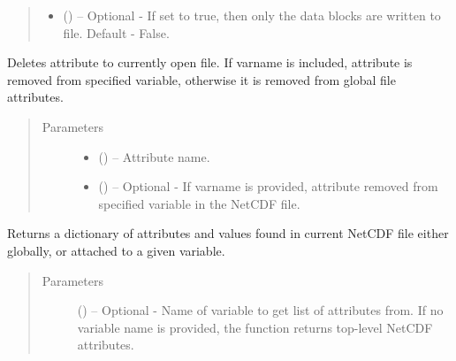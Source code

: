 \documentclass[a4paper,10pt,openany,english]{sphinxmanual}
\begin{document}
\begin{fulllineitems}
\begin{fulllineitems}
\begin{quote}
\begin{description}
\begin{itemize}
\item {} 
 () -- Optional - If set to true, then only the data blocks are written to file.
Default - False.

\end{itemize}

\end{description}\end{quote}

\end{fulllineitems}


\begin{fulllineitems}
\label{egadsapi:egads.input.netcdf_io.NetCdf.delete_attribute}
Deletes attribute to currently open file. If varname is included, attribute
is removed from specified variable, otherwise it is removed from global file
attributes.
\begin{quote}\begin{description}
\item[{Parameters}] \leavevmode\begin{itemize}
\item {} 
 () -- Attribute name.

\item {} 
 () -- Optional - If varname is provided, attribute removed from specified
variable in the NetCDF file.

\end{itemize}

\end{description}\end{quote}

\end{fulllineitems}


\begin{fulllineitems}
\label{egadsapi:egads.input.netcdf_io.NetCdf.get_attribute_list}
Returns a dictionary of attributes and values found in current NetCDF file
either globally, or attached to a given variable.
\begin{quote}\begin{description}
\item[{Parameters}] \leavevmode
{} () -- Optional - Name of variable to get list of attributes from. If no variable name is
provided, the function returns top-level NetCDF attributes.


\end{description}
\end{quote}
\end{fulllineitems}
\end{fulllineitems}
\end{document}
